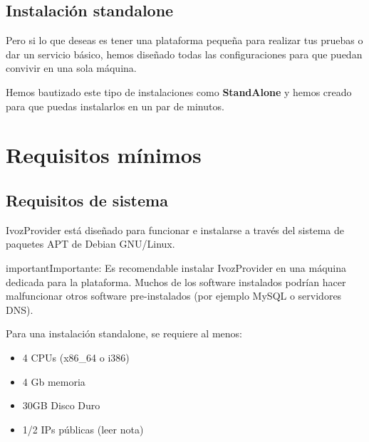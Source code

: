 \documentclass[letterpaper,10pt,spanish]{sphinxmanual}
\begin{document}
\subsection{Instalación standalone}
\label{basic_concepts/installation/install_types:instalacion-standalone}\label{basic_concepts/installation/install_types:id2}\label{basic_concepts/installation/install_types:standalone-install}
Pero si lo que deseas es tener una plataforma pequeña para realizar tus pruebas o dar un servicio básico, hemos diseñado todas las configuraciones para que puedan convivir en una sola máquina.

Hemos bautizado este tipo de instalaciones como \textbf{StandAlone} y hemos  creado {\hyperref[basic_concepts/installation/cd_install:cds\string-automaticos\string-de\string-instalacion]{}} para que puedas instalarlos en un par de minutos.
\label{basic_concepts/installation/requirements:minimum-requirements}

\section{Requisitos mínimos}
\label{basic_concepts/installation/requirements:requisitos-minimos}\label{basic_concepts/installation/requirements:id1}\label{basic_concepts/installation/requirements::doc}\label{basic_concepts/installation/requirements:minimum-requirements}

\subsection{Requisitos de sistema}
\label{basic_concepts/installation/requirements:system-requirements}
IvozProvider está diseñado para funcionar e instalarse a través del sistema de paquetes APT de Debian GNU/Linux.

\begin{notice}{important}{Importante:}
Es recomendable instalar IvozProvider en una máquina dedicada para la plataforma. Muchos de los software instalados podrían hacer malfuncionar otros software pre-instalados (por ejemplo MySQL o servidores DNS).
\end{notice}

Para una instalación standalone, se requiere al menos:
\begin{itemize}
\item {} 
4 CPUs (x86\_64 o i386)

\item {} 
4 Gb memoria

\item {} 
30GB Disco Duro

\item {} 
1/2 IPs públicas (leer nota)

\end{itemize}
\end{document}

